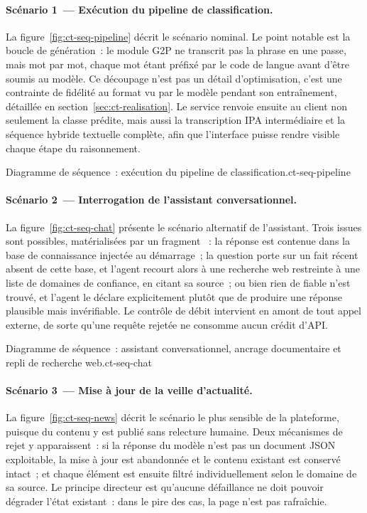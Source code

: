 \paragraph{Scénario 1~— Exécution du pipeline de classification.}
La figure~\ref{fig:ct-seq-pipeline} décrit le scénario nominal. Le point notable est
la boucle de génération~: le module G2P ne transcrit pas la phrase en une passe, mais
mot par mot, chaque mot étant préfixé par le code de langue avant d'être soumis au
modèle. Ce découpage n'est pas un détail d'optimisation, c'est une contrainte de
fidélité au format vu par le modèle pendant son entraînement, détaillée en
section~\ref{sec:ct-realisation}. Le service renvoie ensuite au client non seulement la classe
prédite, mais aussi la transcription IPA intermédiaire et la séquence hybride
textuelle complète, afin que l'interface puisse rendre visible chaque étape du
raisonnement.

{Diagramme de séquence~: exécution du pipeline de classification.}{ct-seq-pipeline}

\paragraph{Scénario 2~— Interrogation de l'assistant conversationnel.}
La figure~\ref{fig:ct-seq-chat} présente le scénario alternatif de l'assistant. Trois
issues sont possibles, matérialisées par un fragment ~: la réponse est
contenue dans la base de connaissance injectée au démarrage~; la question porte sur un
fait récent absent de cette base, et l'agent recourt alors à une recherche web
restreinte à une liste de domaines de confiance, en citant sa source~; ou bien rien
de fiable n'est trouvé, et l'agent le déclare explicitement plutôt que de produire
une réponse plausible mais invérifiable. Le contrôle de débit intervient en amont de
tout appel externe, de sorte qu'une requête rejetée ne consomme aucun crédit d'API.

{Diagramme de séquence~: assistant conversationnel, ancrage documentaire et repli
	de recherche web.}{ct-seq-chat}

\paragraph{Scénario 3~— Mise à jour de la veille d'actualité.}
La figure~\ref{fig:ct-seq-news} décrit le scénario le plus sensible de la plateforme,
puisque du contenu y est publié sans relecture humaine. Deux mécanismes de rejet y
apparaissent~: si la réponse du modèle n'est pas un document JSON exploitable, la
mise à jour est abandonnée et le contenu existant est conservé intact~; et chaque
élément est ensuite filtré individuellement selon le domaine de sa source. Le
principe directeur est qu'aucune défaillance ne doit pouvoir dégrader l'état
existant~: dans le pire des cas, la page n'est pas rafraîchie.

